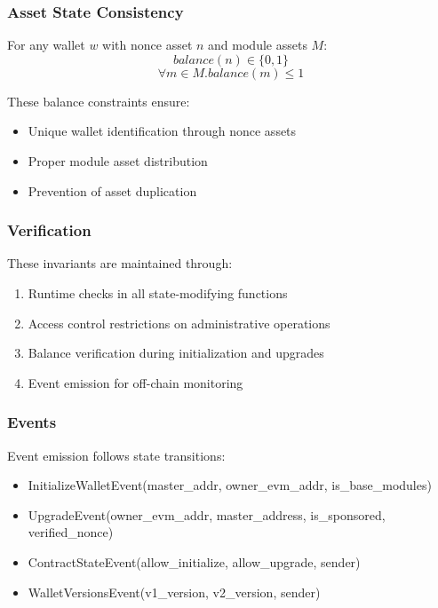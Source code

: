 \subsubsection{Asset State Consistency}
For any wallet $w$ with nonce asset $n$ and module assets $M$:
\[ balance(n) \in \{0, 1\} \]
\[ \forall m \in M. balance(m) \leq 1 \]

These balance constraints ensure:
\begin{itemize}
   \item Unique wallet identification through nonce assets
   \item Proper module asset distribution
   \item Prevention of asset duplication
\end{itemize}

\subsubsection{Verification}
These invariants are maintained through:
\begin{enumerate}
   \item Runtime checks in all state-modifying functions
   \item Access control restrictions on administrative operations
   \item Balance verification during initialization and upgrades
   \item Event emission for off-chain monitoring
\end{enumerate}

\subsubsection{Events}
Event emission follows state transitions:
\begin{itemize}
    \item InitializeWalletEvent(master\_addr, owner\_evm\_addr, is\_base\_modules)
    \item UpgradeEvent(owner\_evm\_addr, master\_address, is\_sponsored, verified\_nonce)
    \item ContractStateEvent(allow\_initialize, allow\_upgrade, sender)
    \item WalletVersionsEvent(v1\_version, v2\_version, sender)
\end{itemize}

